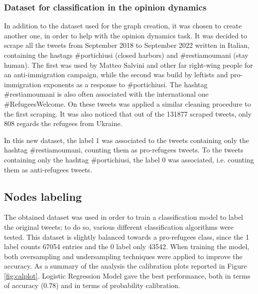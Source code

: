\documentclass[sigchi]{acmart}
\begin{document}
\subsubsection{Dataset for classification in the opinion dynamics}
In addition to the dataset used for the graph creation, it was chosen to create another one, in order to help with the opinion dynamics task. 
It was decided to scrape all the tweets from September 2018 to September 2022 written in Italian, containing the hastags \#portichiusi (closed harbors) and \#restiamoumani (stay human). The first was used by Matteo Salvini and other far right-wing people for an anti-immigration campaign\cite{portichiusi}, while the second was build by leftists and pro-immigration exponents as a response to \#portichiusi. The hashtag \#restiamoumani is also often associated with the international one \#RefugeesWelcome. 
On these tweets was applied a similar cleaning procedure to the first scraping. It was also noticed that out of the 131877 scraped tweets, only 808 regards the refugees from Ukraine.

In this new dataset, the label 1 was associated to the tweets containing only the hashtag \#restiamoumani, counting them as pro-refugees tweets. To the tweets containing only the hashtag \#portichiusi, the label 0 was associated, i.e. counting them as anti-refugees tweets. 


\subsection{Nodes labeling}
The obtained dataset was used in order to train a classification model to label the original tweets; to do so, various different classification algorithms were tested. This dataset is slightly balanced towards a pro-refugees class, since the 1 label counts 67054 entries and the 0 label only 43542. When training the model, both oversampling and undersampling techniques were applied to improve the accuracy.
As a summary of the analysis the calibration plots  reported in Figure \ref{fig:calplot}. Logistic Regression Model gave the best performance, both in terms of accuracy (0.78) and in terms of probability calibration. 
\end{document}
